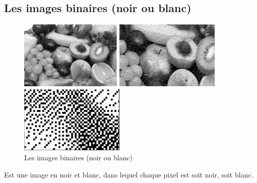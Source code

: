\documentclass[12pt,a4paper]{report}
\numberwithin{equation}{subsection}
\numberwithin{equation}{section}
\begin{document}
\subsection{Les images binaires (noir ou blanc)}
\begin{figure}[!h]
    \centering
    \begin{minipage}[b]{0.3\textwidth}
        \includegraphics[height=3.25cm,width=3.5cm\textwidth]{noir1.png}
    \end{minipage}
    \begin{minipage}[b]{0.3\textwidth}
        \includegraphics[height=3.25cm,width=3.5cm\textwidth]{noir3.png}
    \end{minipage}
    \begin{minipage}[b]{0.3\textwidth}
        \includegraphics[height=3.25cm,width=3.5cm\textwidth]{noir2.png}
    \end{minipage}
    \caption{Les images binaires (noir ou blanc) }
\end{figure}

Est une image en noir et blanc, dans lequel chaque pixel est soit noir, soit blanc.
\end{document}
